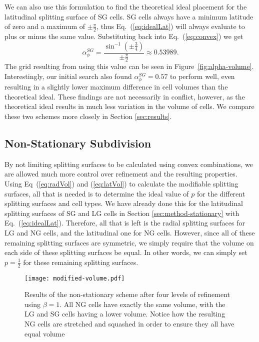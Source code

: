 We can also use this formulation to find the theoretical ideal placement for the latitudinal splitting surface of SG cells.
SG cells always have a minimum latitude of zero and a maximum of $\pm \frac{\pi}{2}$, thus Eq.~(\ref{eq:idealLat}) will always evaluate to plus or minus the same value.
Substituting back into Eq.~(\ref{eq:convex}) we get
%
\begin{equation} \label{eq:latValue}
\alpha_{\phi}^{SG} = \frac{ \sin^{-1} \left( \pm \frac{3}{4} \right) }{ \pm \frac{\pi}{2} } \approx 0.53989.
\end{equation}
%
The grid resulting from using this value can be seen in Figure~\ref{fig:alpha-volume}.
Interestingly, our initial search also found $\alpha_{\phi}^{SG} = 0.57$ to perform well, even resulting in a slightly lower maximum difference in cell volumes than the theoretical ideal.
These findings are not necessarily in conflict, however, as the theoretical ideal results in much less variation in the volume of cells.
We compare these two schemes more closely in Section \ref{sec:results}.


\subsection{Non-Stationary Subdivision} \label{sec:method-nonStationary}
By not limiting splitting surfaces to be calculated using convex combinations, we are allowed much more control over refinement and the resulting properties.
Using Eq~(\ref{eq:radVol}) and (\ref{eq:latVol}) to calculate the modifiable splitting surfaces, all that is needed is to determine the ideal value of $p$ for the different splitting surfaces and cell types.
We have already done this for the latitudinal splitting surfaces of SG and LG cells in Section \ref{sec:method-stationary} with Eq.~(\ref{eq:idealLat}).
Therefore, all that is left is the radial splitting surfaces for LG and NG cells, and the latitudinal one for NG cells.
However, since all of these remaining splitting surfaces are symmetric, we simply require that the volume on each side of these splitting surfaces be equal.
In other words, we can simply set $p = \frac{1}{2}$ for these remaining splitting surfaces.


\begin{figure}[tb]
	\texttt{[image: modified-volume.pdf]}
	\caption[Title]{
		Results of the non-stationary scheme after four levels of refinement using $\beta = 1$.
		All NG cells have exactly the same volume, with the LG and SG cells having a lower volume.
		Notice how the resulting NG cells are stretched and squashed in order to ensure they all have equal volume
	}
	\label{fig:modified-results}
\end{figure}


